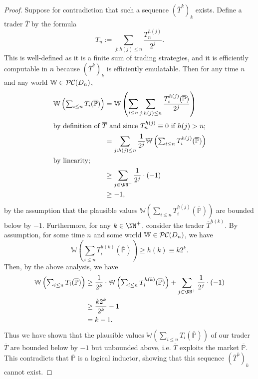 \documentclass[authordate,onecolumn,noenvironments]{miri-tech-article}
\numberwithin{equation}{subsection}
\newcommand{\seq}[1]{{\overline{#1}}}
\newcommand{\li}{logical inductor}
\newcommand{\trade}{T}%
\newcommand{\Trader}{\seq{\trade}} %
\newcommand{\BelState}{\mathbb{P}}
\newcommand{\pt}{\BelState}
\newcommand{\MP}{\seq{\pt}}
\newcommand{\dt}{D}
\newcommand{\pcworlds}{\mathcal{P\-C}}
\newcommand{\World}{\mathbb{W}}
\newcommand{\itwoi}[1]{h(#1)}
\begin{document}
\begin{proof}
  Suppose for contradiction that such a sequence $(\Trader^k)_k$  exists. Define a trader $\Trader$ by the formula
%
\[ \trade_n := \sum_{j: \itwoi{j} \leq n} \frac{\trade_n^{\itwoi{j}}}{2^j}. \]
%
This is well-defined as it is a finite sum of trading strategies, and it is efficiently computable in $n$ because $(\Trader^k)_k$  is efficiently emulatable. 
Then for any time $n$ and any world $\World \in \pcworlds(\dt_{n})$, 
%
\begin{align*}
\World\left({\textstyle \sum_{i \leq n} \trade_i(\MP)}\right) 
&= 
\World\left(\sum_{i \leq n} \sum_{j: \itwoi{j} \leq n} \frac{\trade_i^{\itwoi{j}} (\MP)}{2^j}\right) \\
\shortintertext{by definition of $\Trader$ and  since $\trade_n^{\itwoi{j}}\equiv 0 $ if $\itwoi{j} > n$;}
&= 
\sum_{j: \itwoi{j} \leq n}\frac{1}{2^j}\World\left(\textstyle{ \sum_{i \leq n}  \trade_i^{\itwoi{j}} (\MP)} \right) \\
\shortintertext{by linearity;}
&\geq \sum_{j\in \NN^+}\frac{1}{2^j} \cdot (-1) \\
&\geq -1 ,
\end{align*}
%
by the assumption that the plausible values $\World\left(\textstyle{ \sum_{i \leq n}  \trade_i^{\itwoi{j}} (\MP)} \right)$ are bounded below by $-1$.
Furthermore, for any $k \in \NN^+$, consider the trader $\Trader^{\itwoi{k}}$.  By assumption, for some time $n$ and some 
world $\World \in \pcworlds(\dt_{n})$, we have 
%
\[\World\left(\textstyle{ \sum_{i \leq n}  \trade_i^{\itwoi{k}} (\MP)} \right) \geq \itwoi{k} \equiv k 2^{k}. \]
%
Then, by the above analysis, we have
%
\begin{align*}
\World\left({\textstyle \sum_{i \leq n} \trade_i(\MP)}\right) 
&\geq  \frac{1}{2^{k}}\cdot \World\left(\textstyle{ \sum_{i \leq n}  \trade_i^{\itwoi{k}} (\MP)} \right)  + \sum_{j \in \NN^+}\frac{1}{2^j} \cdot (-1)\\
&\geq  \frac{k 2^{k}}{2^{k}} -1\\
&=k-1.
\end{align*}
%
Thus we have shown that the plausible values  
$\World\left({\textstyle \sum_{i \leq n} \trade_i(\MP)}\right) $ of our trader $\Trader$ are bounded below by $-1$ but unbounded above, i.e. 
$\Trader$ exploits the market $\MP$. This  contradicts that $\MP$ is a \li{}, showing that this sequence $(\Trader^k)_k$ cannot exist. 

\end{proof}
\end{document}
